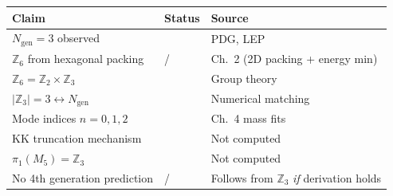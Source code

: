 \begin{tcolorbox}[colback=orange!5, colframe=orange!50!black,
    title=\textbf{Epistemic Audit: Chapter 5}]
\begin{center}
\small
\begin{tabular}{lll}
\toprule
\textbf{Claim} & \textbf{Status} & \textbf{Source} \\
\midrule
$N_{\text{gen}} = 3$ observed & \tagBL{} & PDG, LEP \\
$\mathbb{Z}_6$ from hexagonal packing & \tagDc{}/\tagP{} & Ch.~2 (2D packing + energy min) \\
$\mathbb{Z}_6 = \mathbb{Z}_2 \times \mathbb{Z}_3$ & \tagM{} & Group theory \\
$|\mathbb{Z}_3| = 3 \leftrightarrow N_{\text{gen}}$ & \tagI{} & Numerical matching \\
Mode indices $n = 0,1,2$ & \tagI{} & Ch.~4 mass fits \\
KK truncation mechanism & \tagP{} & Not computed \\
$\pi_1(M_5) = \mathbb{Z}_3$ & \tagP{} & Not computed \\
No 4th generation prediction & \tagI{}/\tagP{} & Follows from $\mathbb{Z}_3$ \emph{if} derivation holds \\
\bottomrule
\end{tabular}
\end{center}
\end{tcolorbox}

